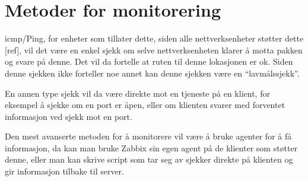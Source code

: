 \section{Metoder for monitorering}
\gls{icmp}/Ping, for enheter som tillater dette, siden alle nettverksenheter støtter dette [ref], vil det være en enkel sjekk om selve nettverksenheten klarer å motta pakken og svare på denne. Det vil da fortelle at ruten til denne lokasjonen er ok. Siden denne sjekken ikke forteller noe annet kan denne sjekken være en “lavmålssjekk”.

En annen type sjekk vil da være direkte mot en tjeneste på en klient, for eksempel å sjekke om en port er åpen, eller om klienten svarer med forventet informasjon ved sjekk mot en port.

Den mest avanserte metoden for å monitorere vil være å bruke agenter for å få informasjon, da kan man bruke Zabbix sin egen agent på de klienter som støtter denne, eller man kan skrive script som tar seg av sjekker direkte på klienten og gir informasjon tilbake til server.

